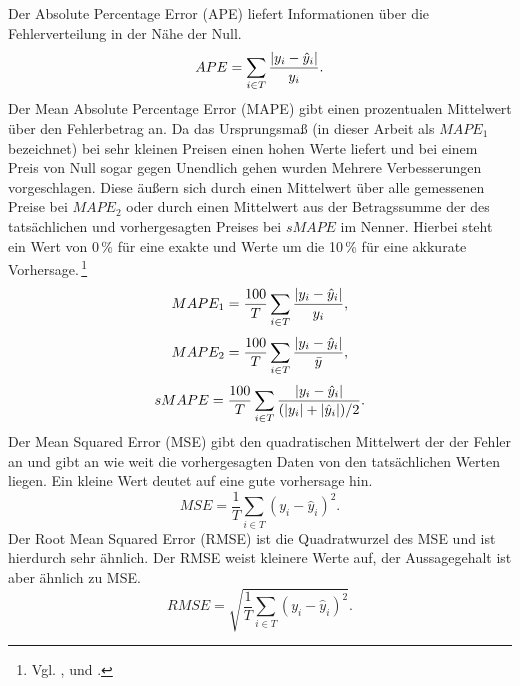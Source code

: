 Der Absolute Percentage Error (\gls{APE}) liefert Informationen über die Fehlerverteilung in der Nähe der Null.\,
%
\begin{equation}
APE= \sum\limits_{i \in T} \frac{\abs{y_i-\hat{y}_i}}{y_i}.
\label{gl:APE}
\end{equation}
%
%
Der Mean Absolute Percentage Error (\gls{MAPE}) gibt einen prozentualen Mittelwert über den Fehlerbetrag an. Da das Ursprungsmaß (in dieser Arbeit als $MAPE_1$ bezeichnet) bei sehr kleinen Preisen einen hohen Werte liefert und bei einem Preis von Null sogar gegen Unendlich gehen wurden Mehrere Verbesserungen vorgeschlagen. Diese äußern sich durch einen Mittelwert über alle gemessenen Preise bei $MAPE_2$ oder durch einen Mittelwert aus der Betragssumme der des tatsächlichen und vorhergesagten Preises bei $sMAPE$ im Nenner. Hierbei steht ein Wert von 0\,\% für eine exakte und Werte um die 10\,\% für eine akkurate Vorhersage.\,\footnote{Vgl. \citet[17]{Bobinaite2016}, \citet[2105]{Amjady2009} und \citet[894]{Lago2018}.}   
\begin{equation}
MAPE_1= \frac{100}{T} \sum\limits_{i \in T} \frac{\abs{y_i-\hat{y}_i}}{y_i},
\label{gl:MAPE_1}
\end{equation}
%
\begin{equation}
MAPE_2= \frac{100}{T} \sum\limits_{i \in T} \frac{\abs{y_i-\hat{y}_i}}{\bar{y}},
\label{gl:MAPE_2}
\end{equation}
%
\begin{equation}
sMAPE= \frac{100}{T} \sum\limits_{i \in T} \frac{\abs{y_i-\hat{y}_i}}{(\abs{y_i} + \abs{\hat{y}_i}) / 2}.
\label{gl:sMAPE}
\end{equation}
%
Der Mean Squared Error (\gls{MSE}) gibt den quadratischen Mittelwert der der Fehler an und gibt an wie weit die vorhergesagten Daten von den tatsächlichen Werten liegen. Ein kleine Wert deutet auf eine gute vorhersage hin.\,
\begin{equation}
MSE= \frac{1}{T} \sum\limits_{i \in T} (y_i-\hat{y}_i)^2.
\label{gl:MSE}
\end{equation}
%
%
Der Root Mean Squared Error (\gls{RMSE}) ist die Quadratwurzel des MSE und ist hierdurch sehr ähnlich. Der RMSE weist kleinere Werte auf, der Aussagegehalt ist aber ähnlich zu MSE.
\begin{equation}
RMSE= \sqrt{ \frac{1}{T} \sum\limits_{i \in T} (y_i-\hat{y}_i)^2}.
\label{gl:RMSE}
\end{equation}
